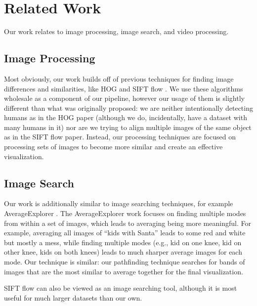 
\section{Related Work}

Our work relates to image processing, image search, and video processing.

\subsection{Image Processing}

Most obviously, our work builds off of previous techniques for finding image differences and similarities, like HOG \cite{HOG} and SIFT flow \cite{SIFTflow}.  We use these algorithms wholesale as a component of our pipeline, however our usage of them is slightly different than what was originally proposed: we are neither intentionally detecting humans as in the HOG paper (although we do, incidentally, have a dataset with many humans in it) nor are we trying to align multiple images of the same object as in the SIFT flow paper.  Instead, our processing techniques are focused on processing sets of images to become more similar and create an effective visualization.

\subsection{Image Search}

Our work is additionally similar to image searching techniques, for example AverageExplorer \cite{averageExplorer}.  The AverageExplorer work focuses on finding multiple modes from within a set of images, which leads to averaging being more meaningful.  For example, averaging all images of ``kids with Santa'' leads to some red and white but mostly a mess, while finding multiple modes (e.g., kid on one knee, kid on other knee, kids on both knees) leads to much sharper average images for each mode.  Our technique is similar: our pathfinding technique searches for bands of images that are the most similar to average together for the final visualization.

SIFT flow \cite{SIFTflow} can also be viewed as an image searching tool, although it is most useful for much larger datasets than our own.

